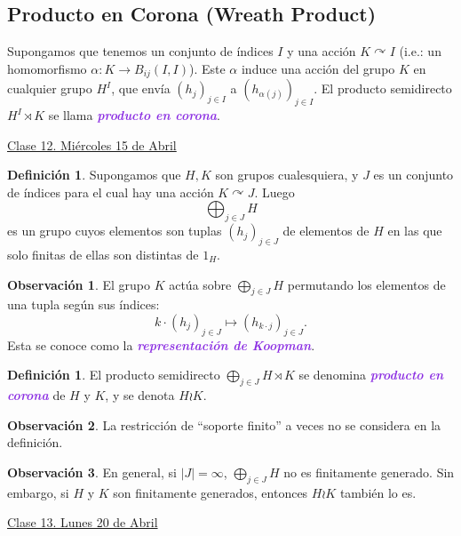 \documentclass{article}
\theoremstyle{definition}
\newtheorem{definition}[theorem]{Definición}
\newtheorem*{obs}{Observación}
\theoremstyle{remark}
\numberwithin{equation}{section}
\renewcommand{\a}{\alpha}
\newcommand{\oo}{\infty}
\newcommand{\acts}{\curvearrowright}
\renewcommand{\c}{\cdot}
\newcommand{\abs}[1]{\left| #1 \right|}
\newcommand{\ds}{\displaystyle}
\newcommand{\wea}[1]{\textcolor{BlueViolet}{\textbf{\emph{#1}}}}
\newcommand{\fecha}[1]{\begin{flushright} \underline{#1} \end{flushright}}
\begin{document}
\subsection{Producto en Corona (Wreath Product)}

Supongamos que tenemos un conjunto de índices $I$ y una acción $K \acts I$ (i.e.: un homomorfismo $\a \colon K \to B_{ij}(I,I)$). Este $\a$ induce una acción del grupo $K$ en cualquier grupo $H^I$, que envía $(h_j)_{j \in I}$ a $(h_{\a(j)})_{j \in I}$. El producto semidirecto $H^I \rtimes K$ se llama \wea{producto en corona}.

\fecha{Clase 12. Miércoles 15 de Abril}

\begin{definition}
  Supongamos que $H,K$ son grupos cualesquiera, y $J$ es un conjunto de índices para el cual hay una acción $K \acts J$. Luego $$\bigoplus _{j\in J} H$$ es un grupo cuyos elementos son tuplas $(h_j)_{j \in J}$ de elementos de $H$ en las que solo finitas de ellas son distintas de $1_H$.
\end{definition}

\begin{obs}
  El grupo $K$ actúa sobre $\bigoplus_{j \in J} H$ permutando los elementos de una tupla según sus índices:
  \[k \c (h_j)_{j \in J} \mapsto (h_{k \c j})_{j \in J}.\]
  Esta se conoce como la \wea{representación de Koopman}.
\end{obs}

\begin{definition}
  El producto semidirecto $\ds \bigoplus_{j \in J} H \rtimes K$ se denomina \wea{producto en corona} de $H$ y $K$, y se denota $H \wr K$.
\end{definition}

\begin{obs}
  La restricción de ``soporte finito'' a veces no se considera en la definición.
\end{obs}

\begin{obs}
  En general, si $\abs J = \oo$, $\ds \bigoplus_{j \in J} H$ no es finitamente generado.
  Sin embargo, si $H$ y $K$ son finitamente generados, entonces $H \wr K$ también lo es.
\end{obs}

\fecha{Clase 13. Lunes 20 de Abril}
\end{document}
